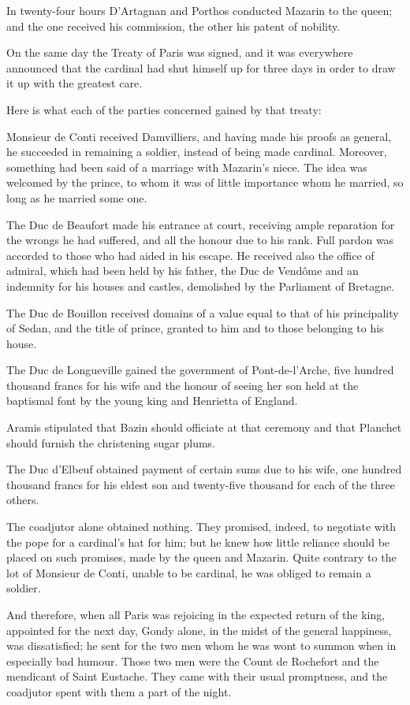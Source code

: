 In twenty-four hours D'Artagnan and Porthos conducted Mazarin to the queen; and the one received his commission, the other his patent of nobility.

On the same day the Treaty of Paris was signed, and it was everywhere announced that the cardinal had shut himself up for three days in order to draw it up with the greatest care.

Here is what each of the parties concerned gained by that treaty:

Monsieur de Conti received Damvilliers, and having made his proofs as general, he succeeded in remaining a soldier, instead of being made cardinal. Moreover, something had been said of a marriage with Mazarin's niece. The idea was welcomed by the prince, to whom it was of little importance whom he married, so long as he married some one.

The Duc de Beaufort made his entrance at court, receiving ample reparation for the wrongs he had suffered, and all the honour due to his rank. Full pardon was accorded to those who had aided in his escape. He received also the office of admiral, which had been held by his father, the Duc de Vendôme and an indemnity for his houses and castles, demolished by the Parliament of Bretagne.

The Duc de Bouillon received domains of a value equal to that of his principality of Sedan, and the title of prince, granted to him and to those belonging to his house.

The Duc de Longueville gained the government of Pont-de-l'Arche, five hundred thousand francs for his wife and the honour of seeing her son held at the baptismal font by the young king and Henrietta of England.

Aramis stipulated that Bazin should officiate at that ceremony and that Planchet should furnish the christening sugar plums.

The Duc d'Elbeuf obtained payment of certain sums due to his wife, one hundred thousand francs for his eldest son and twenty-five thousand for each of the three others.

The coadjutor alone obtained nothing. They promised, indeed, to negotiate with the pope for a cardinal's hat for him; but he knew how little reliance should be placed on such promises, made by the queen and Mazarin. Quite contrary to the lot of Monsieur de Conti, unable to be cardinal, he was obliged to remain a soldier.

And therefore, when all Paris was rejoicing in the expected return of the king, appointed for the next day, Gondy alone, in the midst of the general happiness, was dissatisfied; he sent for the two men whom he was wont to summon when in especially bad humour. Those two men were the Count de Rochefort and the mendicant of Saint Eustache. They came with their usual promptness, and the coadjutor spent with them a part of the night. 